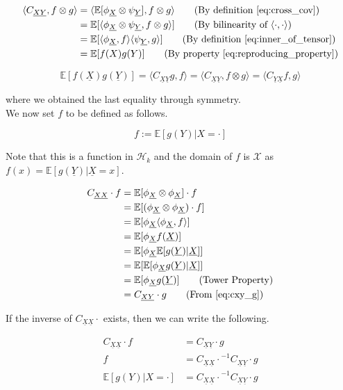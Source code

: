 \documentclass[twoside]{article} \usepackage{aistats2017}
\theoremstyle{definition}
\theoremstyle{definition}
\theoremstyle{remark}
\newcommand{\rv}[1]{\underline{#1}}
\newcommand{\expect}[1]{{\mathbb{E}[#1]}}
\newcommand{\inner}[2]{{\langle #1, #2 \rangle}}
\newcommand{\phiX}{\phi_{\rv{X}}}
\newcommand{\psiY}{\psi_{\rv{Y}}}
\newcommand{\Cxy}{{C_{\rv{X} \rv{Y}}}}
\newcommand{\Cyx}{{C_{\rv{Y} \rv{X}}}}
\newcommand{\Cxx}{{C_{\rv{X} \rv{X}}}}
\begin{document}
		\begin{align*}
			\inner{\Cxy}{f \otimes g} &= \inner{\expect{\phiX \otimes \psiY}}{f \otimes g} \tag{By definition \eqref{eq:cross_cov}} \\
			&= \expect{\inner{\phiX \otimes \psiY}{f \otimes g}} \tag{By bilinearity of $\inner{\cdot}{\cdot}$} \\
			&= \expect{\inner{\phiX}{f} \inner{\psiY}{g}} \tag{By definition \eqref{eq:inner_of_tensor}}\\
			&= \expect{f(X) g(Y)} \tag{By property \eqref{eq:reproducing_property}}
		\end{align*}		
			
		\begin{equation}
			\expect{f(\rv{X}) g(\rv{Y})} = \inner{\Cxy g}{f} = \inner{\Cxy}{f \otimes g} = \inner{\Cyx f}{g}
		\end{equation}
			
		where we obtained the last equality through symmetry. \\
		
		We now set $f$ to be defined as follows.
	
		\begin{equation}
			f := \expect{g(Y) | X = \cdot}
		\end{equation}
		
		Note that this is a function in $\mathcal{H}_{k}$ and the domain of $f$ is $\mathcal{X}$ as $f(x) = \expect{g(\rv{Y}) | \rv{X} = x}$.
		
		\begin{align*}
			\Cxx \cdot f &= \expect{\phiX \otimes \phiX} \cdot f \\
			&= \expect{(\phiX \otimes \phiX) \cdot f} \\
			&= \expect{\phiX \inner{\phiX}{f}} \\
			&= \expect{\phiX f(\rv{X})} \\
			&= \expect{\phiX \expect{g(\rv{Y}) | \rv{X}}} \\
			&= \expect{\expect{\phiX g(\rv{Y}) | \rv{X}}} \\
			&= \expect{\phiX g(\rv{Y})} \tag{Tower Property} \\
			&= \Cxy \cdot g \tag{From \ref{eq:cxy_g}}
		\end{align*}
		
		If the inverse of $\Cxx \cdot$ exists, then we can write the following.
		
		\begin{equation}
		\begin{aligned}
			\Cxx \cdot f &= \Cxy \cdot g \\
			f &= {\Cxx \cdot}^{-1} \Cxy \cdot g \\
			\expect{g(Y) | X = \cdot} &= {\Cxx \cdot}^{-1} \Cxy \cdot g
		\end{aligned}
		\end{equation}
\end{document}
